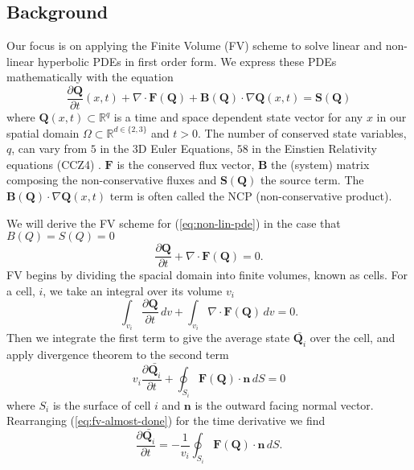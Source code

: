 \subsection{Background}
Our focus is on applying the Finite Volume (FV) scheme to solve linear and non-linear hyperbolic PDEs in first order form.
We express these PDEs mathematically with the equation
\begin{equation}\label{eq:non-lin-pde}
    \frac{\partial \mathbf{Q}}{\partial t}(x,t) + \nabla \cdot \mathbf{F}(\mathbf{Q}) + \mathbf{B}(\mathbf{Q}) \cdot \nabla \mathbf{Q}(x,t) = \mathbf{S}(\mathbf{Q})
\end{equation}
where $\mathbf{Q}(x,t)\subset \mathbb{R}^q$ is a time and space dependent state vector for any $x$ in our spatial domain $\Omega\subset \mathbb{R}^{d \in \{2,3\}}$ and $t>0$.
The number of conserved state variables, $q$, can vary from $5$ in the 3D Euler Equations, $58$ in the Einstien Relativity equations (CCZ4) \cite{CCZ4}.
$\mathbf{F}$ is the conserved flux vector, $\mathbf{B}$ the (system) matrix composing the non-conservative fluxes and $\mathbf{S}(\mathbf{Q})$ the source term.
The $\mathbf{B}(\mathbf{Q}) \cdot \nabla \mathbf{Q}(x,t)$ term is often called the NCP (non-conservative product).


We will derive the FV scheme for  (\ref{eq:non-lin-pde}) in the case that $B(Q)=S(Q)=0$
\begin{equation*}
    \frac{\partial \mathbf{Q}}{\partial t} + \nabla\cdot \mathbf{F}(\mathbf{Q}) = 0.
\end{equation*}
FV begins by dividing the spacial domain into finite volumes, known as cells.
For a cell, $i$, we take an integral over its volume $v_i$
\begin{equation*}
    \int_{v_i}\frac{\partial \mathbf{Q}}{\partial t}\,dv + \int_{v_i}\nabla\cdot \mathbf{F}(\mathbf{Q})\,dv = 0.
\end{equation*}
Then we integrate the first term to give the average state $\bar{\mathbf{Q}_i}$ over the cell, and apply divergence theorem to the second term
\begin{equation}\label{eq:fv-almost-done}
    v_i\frac{\partial \bar{\mathbf{Q}_i}}{\partial t} + \oint_{S_i}\mathbf{F}(\mathbf{Q})\cdot \mathbf{n} \, dS = 0
\end{equation}
where $S_i$ is the surface of cell $i$ and $\mathbf{n}$ is the outward facing normal vector.
Rearranging (\ref{eq:fv-almost-done}) for the time derivative we find
\begin{equation}\label{eq:fv-done}
   \frac{\partial \bar{\mathbf{Q}_i}}{\partial t} = -\frac{1}{v_i} \oint_{S_i}\mathbf{F}(\mathbf{Q})\cdot \mathbf{n} \, dS.
\end{equation}

